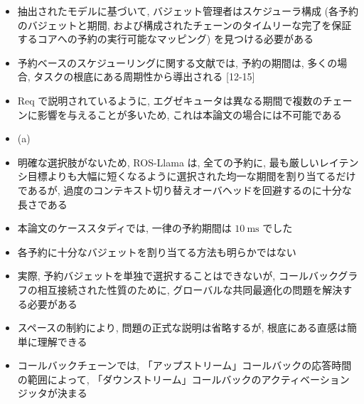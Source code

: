 \begin{frame}{}
    \begin{itemize}
        \item 抽出されたモデルに基づいて, バジェット管理者はスケジューラ構成 (各予約のバジェットと期間, および構成されたチェーンのタイムリーな完了を保証するコアへの予約の実行可能なマッピング) を見つける必要がある
    \end{itemize}
\end{frame}

\begin{frame}{}
    \begin{itemize}
        \item 予約ベースのスケジューリングに関する文献では, 予約の期間は, 多くの場合, タスクの根底にある周期性から導出される [12-15]
        \item Req で説明されているように, エグゼキュータは異なる期間で複数のチェーンに影響を与えることが多いため, これは本論文の場合には不可能である
        \item (a)
        \item 明確な選択肢がないため, ROS-Llama は, 全ての予約に, 最も厳しいレイテンシ目標よりも大幅に短くなるように選択された均一な期間を割り当てるだけであるが, 過度のコンテキスト切り替えオーバヘッドを回避するのに十分な長さである
        \item 本論文のケーススタディでは, 一律の予約期間は $10 \mathrm{~ms}$ でした
    \end{itemize}
\end{frame}

\begin{frame}{}
    \begin{itemize}
        \item 各予約に十分なバジェットを割り当てる方法も明らかではない
        \item 実際, 予約バジェットを単独で選択することはできないが, コールバックグラフの相互接続された性質のために, グローバルな共同最適化の問題を解決する必要がある
        \item スペースの制約により, 問題の正式な説明は省略するが, 根底にある直感は簡単に理解できる
        \item コールバックチェーンでは, 「アップストリーム」コールバックの応答時間の範囲によって, 「ダウンストリーム」コールバックのアクティベーションジッタが決まる
    \end{itemize}
\end{frame}

